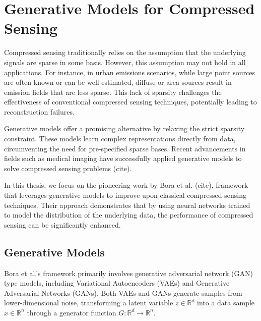 
\section{Generative Models for Compressed Sensing}
Compressed sensing traditionally relies on the assumption that the underlying signals are sparse in some basis.
However, this assumption may not hold in all applications.
For instance, in urban emissions scenarios, while large point sources are often known or can be well-estimated, diffuse or area sources result in emission fields that are less sparse.
This lack of sparsity challenges the effectiveness of conventional compressed sensing techniques, potentially leading to reconstruction failures.

Generative models offer a promising alternative by relaxing the strict sparsity constraint.
These models learn complex representations directly from data, circumventing the need for pre-specified sparse bases.
Recent advancements in fields such as medical imaging have successfully applied generative models to solve compressed sensing problems (cite). %

In this thesis, we focus on the pioneering work by Bora et al. (cite), framework that leverages generative models to improve upon classical compressed sensing techniques.
Their approach demonstrates that by using neural networks trained to model the distribution of the underlying data, the performance of compressed sensing can be significantly enhanced.

\subsection{Generative Models}

Bora et al.'s framework primarily involves generative adversarial network (GAN) type models, including Variational Autoencoders (VAEs) and Generative Adversarial Networks (GANs).
Both VAEs and GANs generate samples from lower-dimensional noise, transforming a latent variable $z \in \mathbb{R}^d$ into a data sample $x \in \mathbb{R}^n$ through a generator function $G: \mathbb{R}^d \to \mathbb{R}^n$.

